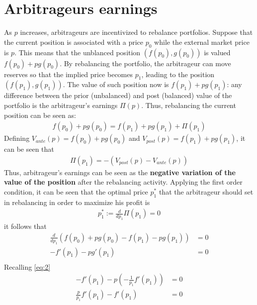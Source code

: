 \documentclass[12pt]{article}
\begin{document}
\section{Arbitrageurs earnings}
As $p$ increases, arbitrageurs are incentivized to rebalance portfolios. \newline Suppose that the current position is associated with a price $p_0$ while the external market price is $p$. \newline This means that the unblanced position $(f(p_0),g(p_0))$ is valued $f(p_0)+pg(p_0)$. \newline By rebalancing the portfolio, the arbitrageur can move reserves so that the implied price becomes $p_1$, leading to the position $(f(p_1),g(p_1))$. \newline The value of such position now is $f(p_1)+pg(p_1)$: any difference between the prior (unbalanced) and post (balanced) value of the portfolio is the arbitrageur's earnings $\Pi(p)$. \newline
Thus, rebalancing the current position can be seen as:
\begin{align*}
    f(p_0)+pg(p_0) = f(p_1)+pg(p_1) + \Pi(p_1)
\end{align*}
Defining $V_{ante}(p)=f(p_0)+pg(p_0)$ and $V_{post}(p)=f(p_1)+pg(p_1)$, it can be seen that
\begin{align*}
    \Pi(p_1) = -(V_{post}(p)-V_{ante}(p))
\end{align*}
Thus, arbitrageur's earnings can be seen as the \textbf{negative variation of the value of the position} after the rebalancing activity.
Applying the first order condition, it can be seen that the optimal price $p_1^*$ that the arbitrageur should set in rebalancing in order to maximize his profit is
\begin{align*}
    p_1^* := \frac{d}{dp_1}\Pi(p_1)=0
\end{align*}
it follows that
\begin{align*}
    \frac{d}{dp_1}\left(f(p_0)+pg(p_0) -f(p_1)-pg(p_1)\right) & = 0 \\
    -f'(p_1)-pg'(p_1)                                         & = 0 \\
\end{align*}
Recalling \eqref{eq:2}
\begin{align*}
    -f'(p_1)-p\left(-\frac{1}{p_1}f'(p_1)\right) & = 0 \\
    \frac{p}{p_1}f'(p_1)-f'(p_1)                 & = 0 \\
\end{align*}
\end{document}
